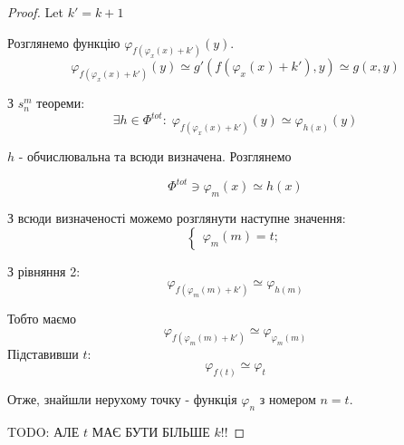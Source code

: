 \documentclass[11pt, a4paper]{article} %
\begin{document}
\begin{proof}
Let $k' = k+1$

Розглянемо функцію $\varphi_{f(\varphi_x(x)+k')}(y)$.
\begin{equation}    
\varphi_{f(\varphi_x(x)+k')}(y) \simeq g'(f(\varphi_x(x)+k'),y) \simeq g(x,y)
\end{equation}

З $s_n^m$ теореми:
\begin{equation}
    \exists h\in\Phi^{tot}:\; \varphi_{f(\varphi_x(x)+k')}(y) \simeq \varphi_{h(x)}(y)
\end{equation}

$h$ - обчислювальна та всюди визначена. Розглянемо

\begin{equation}
    \Phi^{tot} \ni \varphi_m(x) \simeq h(x)
\end{equation}

З всюди визначеності можемо розглянути наступне значення:
\begin{equation}
    \begin{cases}
        \varphi_m(m) = t;%
    \end{cases}
\end{equation} 

З рівняння 2:
$$\varphi_{f(\varphi_m(m)+k')} \simeq \varphi_{h(m)} $$%

Тобто маємо
$$\varphi_{f(\varphi_m(m)+k')} \simeq \varphi_{\varphi_{m}(m)}$$
Підставивши $t$:
$$\varphi_{f(t)} \simeq \varphi_{t}$$

Отже, знайшли нерухому точку - функція $\varphi_n$ з номером $n=t$. 

TODO: АЛЕ $t$ МАЄ БУТИ БІЛЬШЕ $k$!!

\end{proof}
\end{document}
